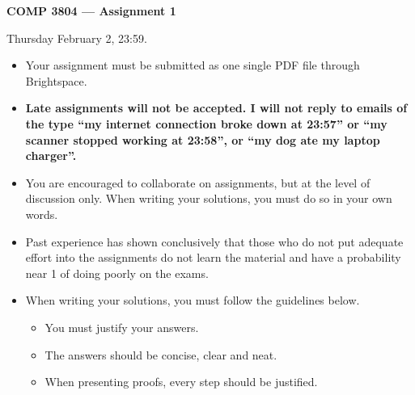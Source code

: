 \documentclass[12pt]{article}
\begin{document}
 

\begin{center} \Large\bf
COMP 3804 --- Assignment 1 
\end{center} 

 Thursday February 2, 23:59.

\vspace{0.5em}

\begin{itemize}
\item Your assignment must be submitted as one single PDF file through
      Brightspace.

\begin{center}
\end{center}
\item {\bf Late assignments will not be accepted. I will not reply to
      emails of the type ``my internet connection broke down at
      23:57'' or ``my scanner stopped working at 23:58'', or
      ``my dog ate my laptop charger''.}
\item You are encouraged to collaborate on assignments, but at the level
      of discussion only. When writing your solutions, you must do so
      in your own words.
\item Past experience has shown conclusively that those who do not put
      adequate effort into the assignments do not learn the material and
      have a probability near 1 of doing poorly on the exams.
\item When writing your solutions, you must follow the guidelines below.
      \begin{itemize}
      \item You must justify your answers.
      \item The answers should be concise, clear and neat.
      \item When presenting proofs, every step should be justified.
      \end{itemize}
\end{itemize}

\begin{center}
\end{center}
\end{document}
